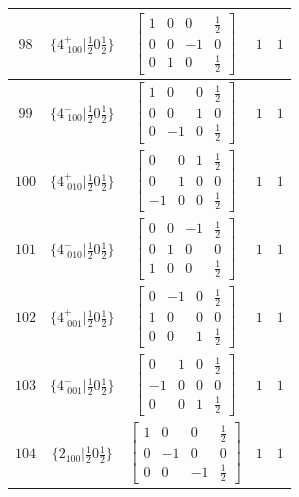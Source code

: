 \documentclass[fleqn,8pt]{jsarticle}
\begin{document}
\begin{longtable}{ccccc}
$ 98 $ & $ \{4^{+}_{\,\,100}|\frac{1}{2} 0 \frac{1}{2}\} $ & $ \begin{bmatrix} 1 & 0 & 0 & \frac{1}{2} \\ 0 & 0 & -1 & 0 \\ 0 & 1 & 0 & \frac{1}{2} \end{bmatrix} $ & $ 1 $ & $ 1 $ \\ \hline
$ 99 $ & $ \{4^{-}_{\,\,100}|\frac{1}{2} 0 \frac{1}{2}\} $ & $ \begin{bmatrix} 1 & 0 & 0 & \frac{1}{2} \\ 0 & 0 & 1 & 0 \\ 0 & -1 & 0 & \frac{1}{2} \end{bmatrix} $ & $ 1 $ & $ 1 $ \\ \hline
$ 100 $ & $ \{4^{+}_{\,\,010}|\frac{1}{2} 0 \frac{1}{2}\} $ & $ \begin{bmatrix} 0 & 0 & 1 & \frac{1}{2} \\ 0 & 1 & 0 & 0 \\ -1 & 0 & 0 & \frac{1}{2} \end{bmatrix} $ & $ 1 $ & $ 1 $ \\ \hline
$ 101 $ & $ \{4^{-}_{\,\,010}|\frac{1}{2} 0 \frac{1}{2}\} $ & $ \begin{bmatrix} 0 & 0 & -1 & \frac{1}{2} \\ 0 & 1 & 0 & 0 \\ 1 & 0 & 0 & \frac{1}{2} \end{bmatrix} $ & $ 1 $ & $ 1 $ \\ \hline
$ 102 $ & $ \{4^{+}_{\,\,001}|\frac{1}{2} 0 \frac{1}{2}\} $ & $ \begin{bmatrix} 0 & -1 & 0 & \frac{1}{2} \\ 1 & 0 & 0 & 0 \\ 0 & 0 & 1 & \frac{1}{2} \end{bmatrix} $ & $ 1 $ & $ 1 $ \\ \hline
$ 103 $ & $ \{4^{-}_{\,\,001}|\frac{1}{2} 0 \frac{1}{2}\} $ & $ \begin{bmatrix} 0 & 1 & 0 & \frac{1}{2} \\ -1 & 0 & 0 & 0 \\ 0 & 0 & 1 & \frac{1}{2} \end{bmatrix} $ & $ 1 $ & $ 1 $ \\ \hline
$ 104 $ & $ \{2{}_{100}|\frac{1}{2} 0 \frac{1}{2}\} $ & $ \begin{bmatrix} 1 & 0 & 0 & \frac{1}{2} \\ 0 & -1 & 0 & 0 \\ 0 & 0 & -1 & \frac{1}{2} \end{bmatrix} $ & $ 1 $ & $ 1 $ \\ \hline

\end{longtable}
\end{document}
